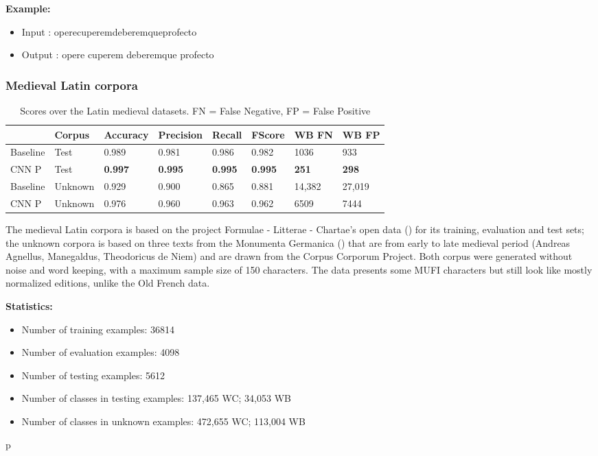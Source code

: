 \documentclass{jdmdh}
\begin{document}
\textbf{Example:}

\begin{itemize}
    \item Input : operecuperemdeberemqueprofecto
    \item Output : opere cuperem deberemque profecto

\end{itemize}

\subsubsection{Medieval Latin corpora}

\begin{table}[H]
\centering
\begin{tabular}{llllllll}
\hline
 & Corpus & Accuracy & Precision & Recall & FScore & WB FN & WB FP \\ \hline
Baseline & Test & 0.989 & 0.981 & 0.986 & 0.982 & 1036 & 933 \\
CNN P & Test & \textbf{0.997} & \textbf{0.995} & \textbf{0.995} & \textbf{0.995} & \textbf{251} & \textbf{298} \\ \hline
Baseline & Unknown & 0.929 & 0.900 & 0.865 & 0.881 & 14,382 & 27,019 \\
CNN P & Unknown & 0.976 & 0.960 & 0.963 & 0.962 & 6509 & 7444\\ \hline
\end{tabular}
\caption{Scores over the Latin medieval datasets. FN = False Negative, FP = False Positive}
\label{tab:medieval_latin_corpora}
\end{table}


The medieval Latin corpora is based on the project Formulae - Litterae - Chartae's open data (\citet{formulae}) for its training, evaluation and test sets; the unknown corpora is based on three texts from the Monumenta Germanica (\citet{germanica}) that are from early to late medieval period (Andreas Agnellus, Manegaldus, Theodoricus de Niem) and are drawn from the Corpus Corporum Project. Both corpus were generated without noise and word keeping, with a maximum sample size of 150 characters. The data presents some MUFI characters but still look like mostly normalized editions, unlike the Old French data.

\textbf{Statistics:}

\begin{itemize}
\item Number of training examples: 36814
\item Number of evaluation examples: 4098
\item Number of testing examples: 5612
\item Number of classes in testing examples: 137,465 WC; 34,053 WB
\item Number of classes in unknown examples: 472,655 WC; 113,004 WB
\end{itemize}p
\end{document}
